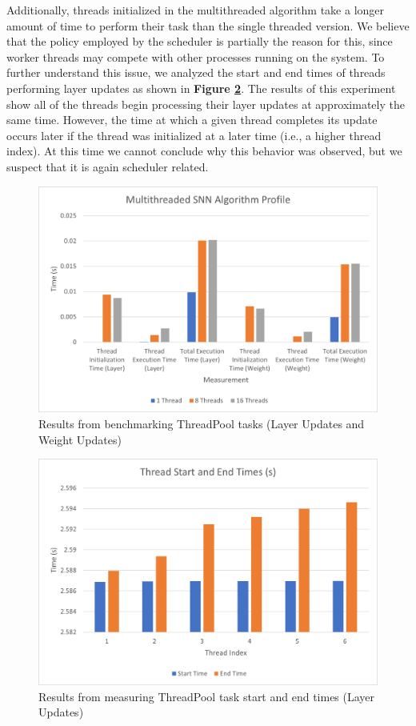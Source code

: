 \documentclass[journal]{IEEEtran}
\begin{document}
Additionally, threads initialized in the multithreaded algorithm take a longer amount of time to perform their task than the single threaded version. We believe that the policy employed by the scheduler is partially the reason for this, since worker threads may compete with other processes running on the system. To further understand this issue, we analyzed the start and end times of threads performing layer updates as shown in \textbf{Figure \ref{fig_snn_thread_times}}. The results of this experiment show all of the threads begin processing their layer updates at approximately the same time. However, the time at which a given thread completes its update occurs later if the thread was initialized at a later time (i.e., a higher thread index). At this time we cannot conclude why this behavior was observed, but we suspect that it is again scheduler related. 

\begin{figure}[!t]
\centering
\includegraphics[width=\linewidth]{thread_profile.png}
\caption{Results from benchmarking ThreadPool tasks (Layer Updates and Weight Updates)}
\label{fig_snn_thread_profile}
\end{figure}

\begin{figure}[!t]
\centering
\includegraphics[width=\linewidth]{thread_start_times.png}
\caption{Results from measuring ThreadPool task start and end times (Layer Updates)}
\label{fig_snn_thread_times}
\end{figure}
\end{document}
